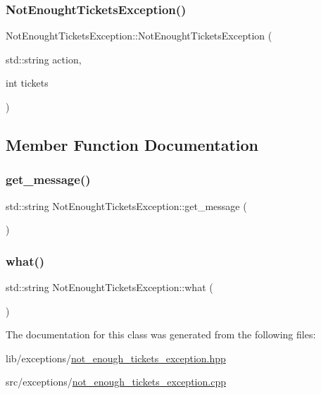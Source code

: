 \subsubsection{\texorpdfstring{Not\+Enought\+Tickets\+Exception()}{NotEnoughtTicketsException()}}
{\footnotesize\ttfamily Not\+Enought\+Tickets\+Exception\+::\+Not\+Enought\+Tickets\+Exception (\begin{DoxyParamCaption}\item[{std\+::string}]{action,  }\item[{int}]{tickets }\end{DoxyParamCaption})}



\subsection{Member Function Documentation}
\mbox{\label{class_not_enought_tickets_exception_a12a085992a667c8859b9f3cc86e44664}} 
\subsubsection{\texorpdfstring{get\+\_\+message()}{get\_message()}}
{\footnotesize\ttfamily std\+::string Not\+Enought\+Tickets\+Exception\+::get\+\_\+message (\begin{DoxyParamCaption}{ }\end{DoxyParamCaption})}

\mbox{\label{class_not_enought_tickets_exception_a5d183eb42cfc1a119c3e33b1e697dc47}} 
\subsubsection{\texorpdfstring{what()}{what()}}
{\footnotesize\ttfamily std\+::string Not\+Enought\+Tickets\+Exception\+::what (\begin{DoxyParamCaption}{ }\end{DoxyParamCaption})}



The documentation for this class was generated from the following files\+:\begin{DoxyCompactItemize}
\item 
lib/exceptions/\hyperlink{not__enough__tickets__exception_8hpp}{not\+\_\+enough\+\_\+tickets\+\_\+exception.\+hpp}\item 
src/exceptions/\hyperlink{not__enough__tickets__exception_8cpp}{not\+\_\+enough\+\_\+tickets\+\_\+exception.\+cpp}\end{DoxyCompactItemize}
